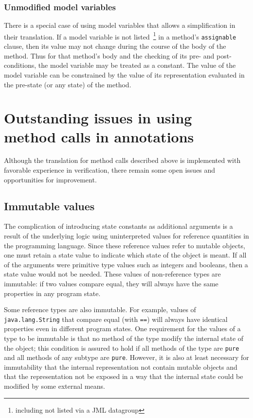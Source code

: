 \documentclass{sig-alternate}
\begin{document}
\subsubsection{Unmodified model variables}

There is a special case of using model variables that allows a simplification in their translation.
If a model variable is not listed~\footnote{including not listed via a JML datagroup} in a
method's \texttt{assignable} clause, then its value may not change during the course of the
body of the method.  Thus for that method's body and the checking of its pre- and
post-conditions, the model variable may be treated as a constant.  The value of the model 
variable can be constrained by the value of its representation evaluated in the pre-state
(or any state) of the method.

\section{Outstanding issues in using \\ method calls in annotations}

Although the translation for method calls described above is implemented with 
favorable experience in verification, there remain some open issues and opportunities 
for improvement.

\subsection{Immutable values}

The complication of introducing state constants as additional arguments is a result of the underlying logic using uninterpreted values for reference quantities in the programming language.
Since these reference values refer to mutable objects, one must retain a state value to 
indicate which state of the object is meant.  If all of the arguments were primitive type values
such as integers and booleans, then a state value would not be needed.  These values of
non-reference types are immutable: if two values compare equal, they will always have the same
properties in any program state. 

Some reference types are also immutable.  For example, values of \texttt{java.lang.String} that
compare equal (with \texttt{==}) will always have identical properties even in different program
states.  One requirement for the values of a type to be immutable is that no method of the type
modify the internal state of the object; this condition is assured to hold if all methods of the type are
\texttt{pure} and all methods of any subtype are \texttt{pure}.  However, it is also at least
necessary for immutability
that the internal representation not contain mutable objects and
that the representation not be exposed  in a way that the internal state could be modified by 
some external means.
\end{document}
